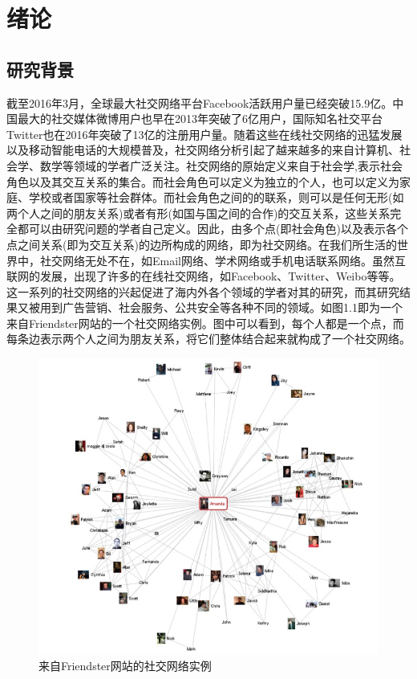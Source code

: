 \chapter{绪论}

\section{研究背景}

截至2016年3月，全球最大社交网络平台Facebook活跃用户量已经突破15.9亿。中国最大的社交媒体微博用户也早在2013年突破了6亿用户，国际知名社交平台Twitter也在2016年突破了13亿的注册用户量。随着这些在线社交网络的迅猛发展以及移动智能电话的大规模普及，社交网络分析引起了越来越多的来自计算机、社会学、数学等领域的学者广泛关注。社交网络的原始定义来自于社会学,表示社会角色以及其交互关系的集合。而社会角色可以定义为独立的个人，也可以定义为家庭、学校或者国家等社会群体。而社会角色之间的的联系，则可以是任何无形(如两个人之间的朋友关系)或者有形(如国与国之间的合作)的交互关系，这些关系完全都可以由研究问题的学者自己定义。因此，由多个点(即社会角色)以及表示各个点之间关系(即为交互关系)的边所构成的网络，即为社交网络。在我们所生活的世界中，社交网络无处不在，如Email网络、学术网络或手机电话联系网络。虽然互联网的发展，出现了许多的在线社交网络，如Facebook、Twitter、Weibo等等。这一系列的社交网络的兴起促进了海内外各个领域的学者对其的研究，而其研究结果又被用到广告营销、社会服务、公共安全等各种不同的领域。如图1.1即为一个来自Friendster网站的一个社交网络实例。图中可以看到，每个人都是一个点，而每条边表示两个人之间为朋友关系，将它们整体结合起来就构成了一个社交网络。

\begin{figure}[!ht]
    \centering
    \includegraphics[]{figure/friends.png}
    \caption{来自Friendster网站的社交网络实例}
    \label{fig-friends}
\end{figure}


